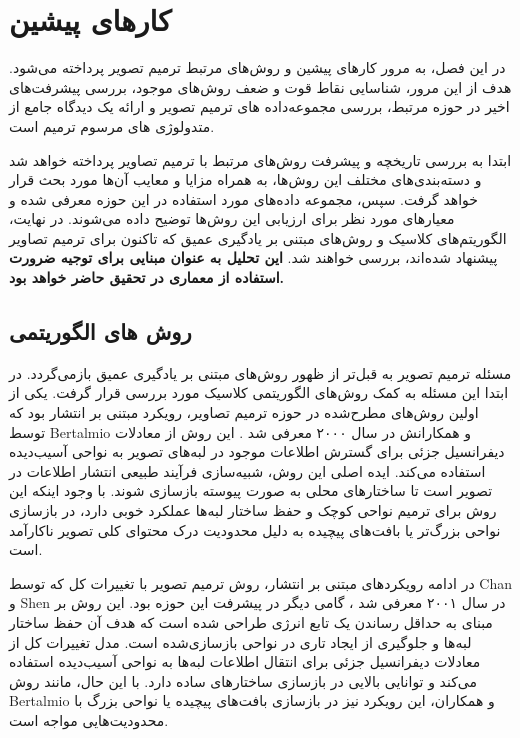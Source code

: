 
\chapter{کارهای پیشین}

در این فصل، به مرور کارهای پیشین و روش‌های مرتبط ترمیم تصویر پرداخته می‌شود. هدف از این مرور، شناسایی نقاط قوت و ضعف روش‌های موجود، بررسی پیشرفت‌های اخیر در حوزه مرتبط، بررسی مجموعه‌داده های ترمیم تصویر و ارائه یک دیدگاه جامع از متدولوژی های مرسوم ترمیم است.

ابتدا به بررسی تاریخچه و پیشرفت روش‌های مرتبط با ترمیم تصاویر پرداخته خواهد شد و دسته‌بندی‌های مختلف این روش‌ها، به همراه مزایا و معایب آن‌ها مورد بحث قرار خواهد گرفت. سپس، مجموعه داده‌های مورد استفاده در این حوزه معرفی شده و معیارهای مورد نظر برای ارزیابی این روش‌ها توضیح داده می‌شوند. در نهایت، الگوریتم‌های کلاسیک و روش‌های مبتنی بر یادگیری عمیق که تاکنون برای ترمیم تصاویر پیشنهاد شده‌اند، بررسی خواهند شد. \textbf{این تحلیل به عنوان مبنایی برای توجیه ضرورت استفاده از معماری  در تحقیق حاضر خواهد بود.}



\section{روش های الگوریتمی}

مسئله ترمیم تصویر به قبل‌تر از ظهور روش‌های مبتنی بر یادگیری عمیق بازمی‌گردد. در ابتدا این مسئله به کمک روش‌های الگوریتمی کلاسیک مورد بررسی قرار گرفت. یکی از اولین روش‌های مطرح‌شده در حوزه ترمیم تصاویر، رویکرد مبتنی بر انتشار بود که توسط Bertalmio و همکارانش در سال ۲۰۰۰ معرفی شد \cite{bertalmioImageInpainting2000}. این روش از معادلات دیفرانسیل جزئی  برای گسترش اطلاعات موجود در لبه‌های تصویر به نواحی آسیب‌دیده استفاده می‌کند. ایده اصلی این روش، شبیه‌سازی فرآیند طبیعی انتشار اطلاعات در تصویر است تا ساختارهای محلی به صورت پیوسته بازسازی شوند. با وجود اینکه این روش برای ترمیم نواحی کوچک و حفظ ساختار لبه‌ها عملکرد خوبی دارد، در بازسازی نواحی بزرگ‌تر یا بافت‌های پیچیده به دلیل محدودیت درک محتوای کلی تصویر ناکارآمد است.

در ادامه رویکردهای مبتنی بر انتشار، روش ترمیم تصویر با تغییرات کل  که توسط Chan و Shen در سال ۲۰۰۱ معرفی شد \cite{chanNontextureInpaintingCurvatureDriven2001}، گامی دیگر در پیشرفت این حوزه بود. این روش بر مبنای به حداقل رساندن یک تابع انرژی طراحی شده است که هدف آن حفظ ساختار لبه‌ها و جلوگیری از ایجاد تاری در نواحی بازسازی‌شده است. مدل تغییرات کل از معادلات دیفرانسیل جزئی برای انتقال اطلاعات لبه‌ها به نواحی آسیب‌دیده استفاده می‌کند و توانایی بالایی در بازسازی ساختارهای ساده دارد. با این حال، مانند روش Bertalmio و همکاران، این رویکرد نیز در بازسازی بافت‌های پیچیده یا نواحی بزرگ با محدودیت‌هایی مواجه است.


